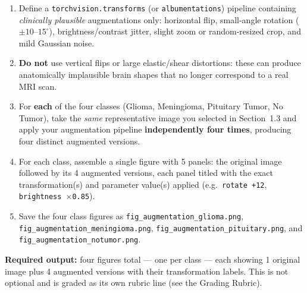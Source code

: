 \documentclass[12pt,a4paper]{article}
\begin{document}
\begin{stepbox}
\begin{enumerate}[leftmargin=*, label=\arabic*.]
  \item Define a \texttt{torchvision.transforms} (or \texttt{albumentations}) pipeline
        containing \emph{clinically plausible} augmentations only:
        horizontal flip, small-angle rotation ($\pm 10$--$15^{\circ}$), brightness/contrast
        jitter, slight zoom or random-resized crop, and mild Gaussian noise.
  \item \textbf{Do not} use vertical flips or large elastic/shear distortions: these
        can produce anatomically implausible brain shapes that no longer correspond to
        a real MRI scan.
  \item For \textbf{each} of the four classes (Glioma, Meningioma, Pituitary Tumor,
        No Tumor), take the \emph{same} representative image you selected in
        Section~1.3 and apply your augmentation pipeline \textbf{independently four
        times}, producing four distinct augmented versions.
  \item For each class, assemble a single figure with 5 panels: the original image
        followed by its 4 augmented versions, each panel titled with the exact
        transformation(s) and parameter value(s) applied (e.g.\ \texttt{rotate
        +12\textdegree{}}, \texttt{brightness $\times$0.85}).
  \item Save the four class figures as \texttt{fig\_augmentation\_glioma.png},
        \texttt{fig\_augmentation\_meningioma.png}, \texttt{fig\_augmentation\_pituitary.png},
        and \texttt{fig\_augmentation\_notumor.png}.
\end{enumerate}
\end{stepbox}

\begin{notebox}
\textbf{Required output:} four figures total --- one per class --- each showing
1 original image plus 4 augmented versions with their transformation labels. This is
not optional and is graded as its own rubric line (see the Grading Rubric).
\end{notebox}
\end{document}
